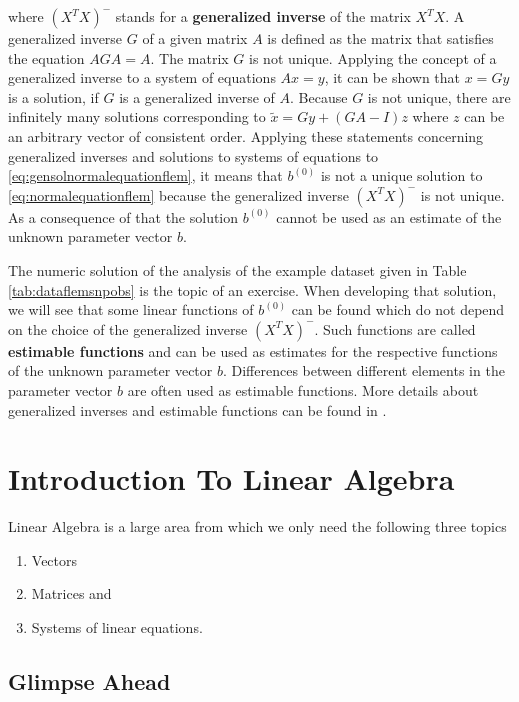 \documentclass[]{book}
\providecommand{\tightlist}{%
  \setlength{\itemsep}{0pt}\setlength{\parskip}{0pt}}
\theoremstyle{definition}
\theoremstyle{definition}
\theoremstyle{definition}
\theoremstyle{remark}
\begin{document}
where \((X^TX)^-\) stands for a \textbf{generalized inverse} of the matrix \(X^TX\). A generalized inverse \(G\) of a given matrix \(A\) is defined as the matrix that satisfies the equation \(AGA = A\). The matrix \(G\) is not unique. Applying the concept of a generalized inverse to a system of equations \(Ax = y\), it can be shown that \(x = Gy\) is a solution, if \(G\) is a generalized inverse of \(A\). Because \(G\) is not unique, there are infinitely many solutions corresponding to \(\tilde{x} = Gy + (GA - I)z\) where \(z\) can be an arbitrary vector of consistent order. Applying these statements concerning generalized inverses and solutions to systems of equations to \eqref{eq:gensolnormalequationflem}, it means that \(b^{(0)}\) is not a unique solution to \eqref{eq:normalequationflem} because the generalized inverse \((X^TX)^-\) is not unique. As a consequence of that the solution \(b^{(0)}\) cannot be used as an estimate of the unknown parameter vector \(b\).

The numeric solution of the analysis of the example dataset given in Table \ref{tab:dataflemsnpobs} is the topic of an exercise. When developing that solution, we will see that some linear functions of \(b^{(0)}\) can be found which do not depend on the choice of the generalized inverse \((X^TX)^-\). Such functions are called \textbf{estimable functions} and can be used as estimates for the respective functions of the unknown parameter vector \(b\). Differences between different elements in the parameter vector \(b\) are often used as estimable functions. More details about generalized inverses and estimable functions can be found in \citep{Searle1971}.

\appendix

\hypertarget{intro-linalg}{%
\chapter{Introduction To Linear Algebra}\label{intro-linalg}}

Linear Algebra is a large area from which we only need the following three topics

\begin{enumerate}
\def\labelenumi{\arabic{enumi}.}
\tightlist
\item
  Vectors
\item
  Matrices and
\item
  Systems of linear equations.
\end{enumerate}

\hypertarget{intro-linalg-glimpse-ahead}{%
\section{Glimpse Ahead}\label{intro-linalg-glimpse-ahead}}
\end{document}
